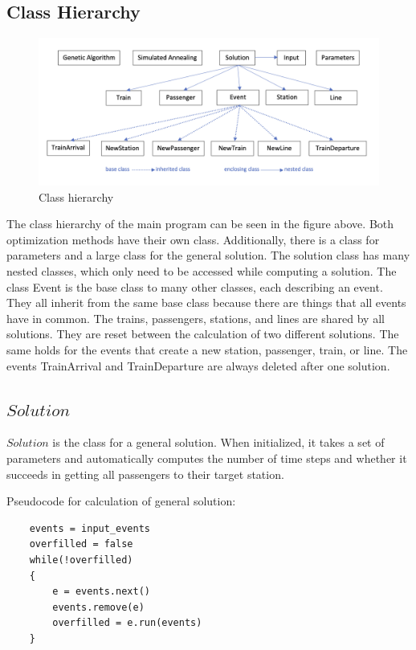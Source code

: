 \documentclass[10pt]{scrreprt}
\begin{document}
\subsection{Class Hierarchy}
\begin{figure}[h]
    \centering
    \includegraphics[scale = 0.8]{pictures/class_hierarchy.png}
    \caption{Class hierarchy}
\end{figure}

The class hierarchy of the main program can be seen in the figure above. Both optimization methods have their own class. Additionally, there is a class for parameters and a large class for the general solution. The solution class has many nested classes, which only need to be accessed while computing a solution. The class Event is the base class to many other classes, each describing an event. They all inherit from the same base class because there are things that all events have in common. The trains, passengers, stations, and lines are shared by all solutions. They are reset between the calculation of two different solutions. The same holds for the events that create a new station, passenger, train, or line. The events TrainArrival and TrainDeparture are always deleted after one solution.


\subsection{$Solution$}
$Solution$ is the class for a general solution. When initialized, it takes a set of parameters and automatically computes the number of time steps and whether it succeeds in getting all passengers to their target station.

Pseudocode for calculation of general solution:
\lstset {language=C++}
\begin{lstlisting}
    events = input_events
    overfilled = false
    while(!overfilled)
    {   
        e = events.next()
        events.remove(e)
        overfilled = e.run(events)
    }
\end{lstlisting}
\end{document}
